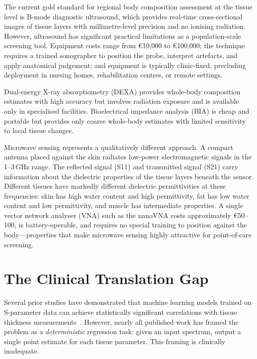 \documentclass[12pt, a4paper, oneside]{report}
\begin{document}
The current gold standard for regional body composition assessment at the tissue level is B-mode diagnostic ultrasound, which provides real-time cross-sectional images of tissue layers with millimetre-level precision and no ionising radiation. However, ultrasound has significant practical limitations as a population-scale screening tool. Equipment costs range from \euro{}10{,}000 to \euro{}100{,}000; the technique requires a trained sonographer to position the probe, interpret artefacts, and apply anatomical judgement; and equipment is typically clinic-fixed, precluding deployment in nursing homes, rehabilitation centres, or remote settings.

Dual-energy X-ray absorptiometry (DEXA) provides whole-body composition estimates with high accuracy but involves radiation exposure and is available only in specialised facilities. Bioelectrical impedance analysis (BIA) is cheap and portable but provides only coarse whole-body estimates with limited sensitivity to local tissue changes.

Microwave sensing represents a qualitatively different approach. A compact antenna placed against the skin radiates low-power electromagnetic signals in the 1--3\,GHz range. The reflected signal (S11) and transmitted signal (S21) carry information about the dielectric properties of the tissue layers beneath the sensor. Different tissues have markedly different dielectric permittivities at these frequencies: skin has high water content and high permittivity, fat has low water content and low permittivity, and muscle has intermediate properties. A single vector network analyser (VNA) such as the nanoVNA costs approximately \euro{}50--100, is battery-operable, and requires no special training to position against the body---properties that make microwave sensing highly attractive for point-of-care screening.

\section{The Clinical Translation Gap}

Several prior studies have demonstrated that machine learning models trained on S-parameter data can achieve statistically significant correlations with tissue thickness measurements~\cite{mattsson2022,sensors21}. However, nearly all published work has framed the problem as a \emph{deterministic} regression task: given an input spectrum, output a single point estimate for each tissue parameter. This framing is clinically inadequate.
\end{document}

